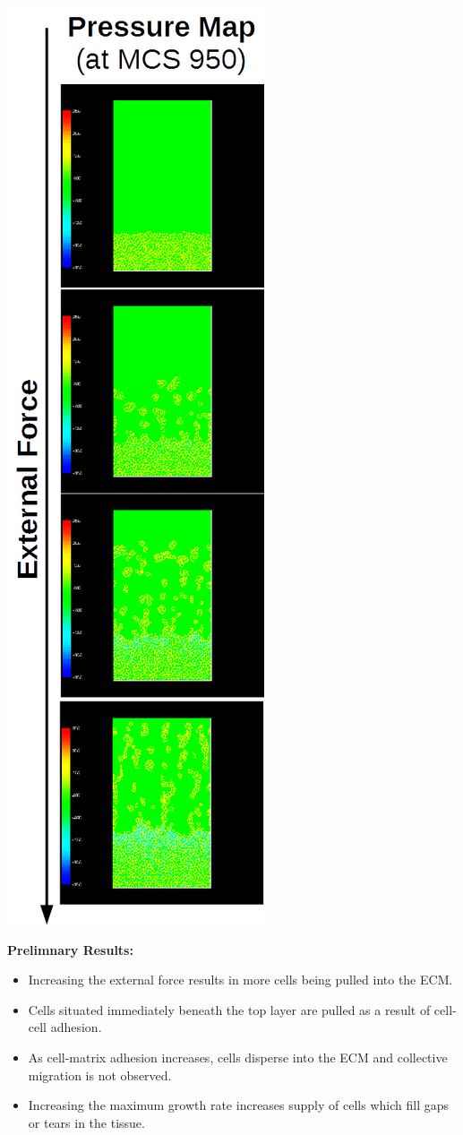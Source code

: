 \documentclass[landscape,a0paper,fontscale=0.292]{baposter}
\newcommand{\compresslist}{%
 \setlength{\itemsep}{1pt}%
 \setlength{\parskip}{0pt}%
 \setlength{\parsep}{0pt}%
 }
\begin{document}
\begin{poster}
{\includegraphics[scale=0.35]{res21}

\textbf{Prelimnary Results:}
\begin{itemize}[leftmargin=*]\compresslist
\item Increasing the external force results in more cells being pulled into the ECM.
\item Cells situated immediately beneath the top layer are pulled as a result of cell-cell adhesion.
\item As cell-matrix adhesion increases, cells disperse into the ECM and collective migration is not observed.
\item Increasing the maximum growth rate increases supply of cells which fill gaps or tears in the tissue.
\end{itemize}

}

\end{poster}
\end{document}
